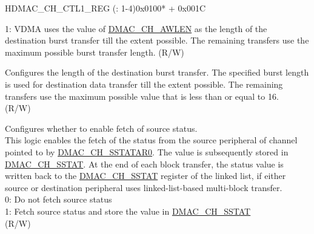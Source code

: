 \begin{register}{H}{DMAC\_CH\_CTL1\_REG (: 1-4)}{0x0100* + 0x001C}
\begin{regdesc}
\begin{reglist}
1: VDMA uses the value of \hyperref[fielddesc:DMACCHNAWLEN]{DMAC\_CH\_AWLEN} as the length of the destination burst transfer till the extent possible. The remaining transfers use the maximum possible burst transfer length. 
(R/W)
\label{fielddesc:DMACCHNAWLEN}\item [DMAC\_CH\regindex{n}\_AWLEN] Configures the length of the destination burst transfer. The specified burst length is used for destination data transfer till the extent possible. The remaining transfers use the maximum possible value that is less than or equal to 16.\\
(R/W)
\label{fielddesc:DMACCHNSRCSTATEN}\item [DMAC\_CH\regindex{n}\_SRC\_STAT\_EN] Configures whether to enable fetch of source status. \\
This logic enables the fetch of the status from the source peripheral of channel  pointed to by \hyperref[fielddesc:DMACCHNSSTATAR0]{DMAC\_CH\_SSTATAR0}. The value is subsequently stored in \hyperref[fielddesc:DMACCHNSSTAT]{DMAC\_CH\_SSTAT}. At the end of each block transfer, the status value is written back to the \hyperref[fielddesc:DMACCHNSSTAT]{DMAC\_CH\_SSTAT} register of the linked list, if either source or destination peripheral uses linked-list-based multi-block transfer. \\
0: Do not fetch source status \\
1: Fetch source status and store the value in \hyperref[fielddesc:DMACCHNSSTAT]{DMAC\_CH\_SSTAT}\\
(R/W)
\item [Continued on the next page...]
\end{reglist}\end{regdesc}
\end{register}

